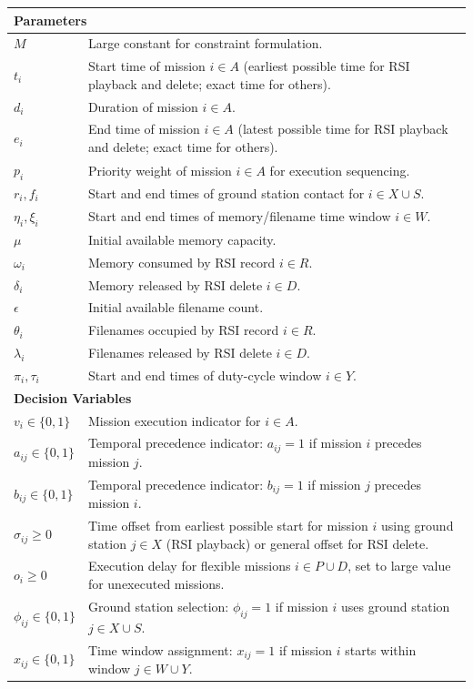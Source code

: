 \documentclass[preprint,3p,12pt,authoryear]{elsarticle}
\begin{document}
\begin{longtable}{p{} p{}}
\hline
\multicolumn{2}{l}{\textbf{Parameters}} \\
\hline
$M$ & Large constant for constraint formulation. \\
$t_i$ & Start time of mission $i \in A$ (earliest possible time for RSI playback and delete; exact time for others). \\
$d_i$ & Duration of mission $i \in A$. \\
$e_i$ & End time of mission $i \in A$ (latest possible time for RSI playback and delete; exact time for others). \\
$p_i$ & Priority weight of mission $i \in A$ for execution sequencing. \\
$r_i, f_i$ & Start and end times of ground station contact for $i \in X \cup S$. \\
$\eta_i, \xi_i$ & Start and end times of memory/filename time window $i \in W$. \\
$\mu$ & Initial available memory capacity. \\
$\omega_i$ & Memory consumed by RSI record $i \in R$. \\
$\delta_i$ & Memory released by RSI delete $i \in D$. \\
$\epsilon$ & Initial available filename count. \\
$\theta_i$ & Filenames occupied by RSI record $i \in R$. \\
$\lambda_i$ & Filenames released by RSI delete $i \in D$. \\
$\pi_i, \tau_i$ & Start and end times of duty-cycle window $i \in Y$. \\
\hline
\multicolumn{2}{l}{\textbf{Decision Variables}} \\
\hline
$v_i \in \{0,1\}$ & Mission execution indicator for $i \in A$. \\
$a_{ij} \in \{0,1\}$ & Temporal precedence indicator: $a_{ij} = 1$ if mission $i$ precedes mission $j$. \\
$b_{ij} \in \{0,1\}$ & Temporal precedence indicator: $b_{ij} = 1$ if mission $j$ precedes mission $i$. \\
$\sigma_{ij} \geq 0$ & Time offset from earliest possible start for mission $i$ using ground station $j \in X$ (RSI playback) or general offset for RSI delete. \\
$o_i \geq 0$ & Execution delay for flexible missions $i \in P \cup D$, set to large value for unexecuted missions. \\
$\phi_{ij} \in \{0,1\}$ & Ground station selection: $\phi_{ij} = 1$ if mission $i$ uses ground station $j \in X \cup S$. \\
$x_{ij} \in \{0,1\}$ & Time window assignment: $x_{ij} = 1$ if mission $i$ starts within window $j \in W \cup Y$. \\
\hline
\end{longtable}
\end{document}
